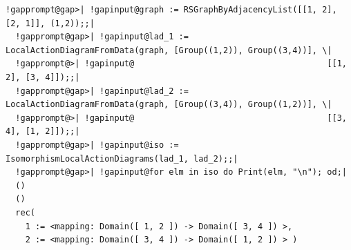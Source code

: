\documentclass[a4paper,11pt]{report}
\begin{document}
{{ 
\begin{Verbatim}[commandchars=!@|,fontsize=\small,frame=single,label=Example]
  !gapprompt@gap>| !gapinput@graph := RSGraphByAdjacencyList([[1, 2], [2, 1]], (1,2));;|
  !gapprompt@gap>| !gapinput@lad_1 := LocalActionDiagramFromData(graph, [Group((1,2)), Group((3,4))], \|
  !gapprompt@>| !gapinput@                                       [[1, 2], [3, 4]]);;|
  !gapprompt@gap>| !gapinput@lad_2 := LocalActionDiagramFromData(graph, [Group((3,4)), Group((1,2))], \|
  !gapprompt@>| !gapinput@                                       [[3, 4], [1, 2]]);;|
  !gapprompt@gap>| !gapinput@iso := IsomorphismLocalActionDiagrams(lad_1, lad_2);;|
  !gapprompt@gap>| !gapinput@for elm in iso do Print(elm, "\n"); od;|
  ()
  ()
  rec(
    1 := <mapping: Domain([ 1, 2 ]) -> Domain([ 3, 4 ]) >,
    2 := <mapping: Domain([ 3, 4 ]) -> Domain([ 1, 2 ]) > )
\end{Verbatim}
 }

 }

   
\end{document}
